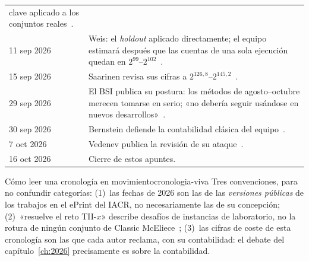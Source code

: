 \begin{longtable}{@{}p{2.6cm}p{12.96cm}@{}}
  clave aplicado a los conjuntos reales~\cite{ghoshal2026}.\\
11 sep 2026 & Weis: el \emph{holdout} aplicado directamente; el
  equipo estimará después que las cuentas de una sola ejecución
  quedan en $2^{99}$--$2^{102}$~\cite{weis2026}.\\
15 sep 2026 & Saarinen revisa sus cifras a
  $2^{126{,}8}$--$2^{145{,}2}$~\cite{saarinen2026b}.\\
29 sep 2026 & El BSI publica su postura: los métodos de agosto--octubre
  merecen tomarse en serio; «no debería seguir usándose en nuevos
  desarrollos»~\cite{bsi2026}.\\
30 sep 2026 & Bernstein defiende la contabilidad clásica del
  equipo~\cite{bernstein2026}.\\
7 oct 2026 & Vedenev publica la revisión de su
  ataque~\cite{vedenev2026}.\\
16 oct 2026 & Cierre de estos apuntes.\\
\end{longtable}

\begin{observacion}{Cómo leer una cronología en movimiento}{cronologia-viva}
Tres convenciones, para no confundir categorías:
(1)~las fechas de 2026 son las de las \emph{versiones públicas} de
los trabajos en el ePrint del IACR, no necesariamente las de su
concepción;
(2)~«resuelve el reto TII-$x$» describe desafíos de instancias de
laboratorio, no la rotura de ningún conjunto de
Classic McEliece~\cite{bardet2026,saarinen2026b};
(3)~las cifras de coste de esta cronología son las que cada autor
reclama, con su contabilidad: el debate del
capítulo~\ref{ch:2026} precisamente es sobre la contabilidad.
\end{observacion}
